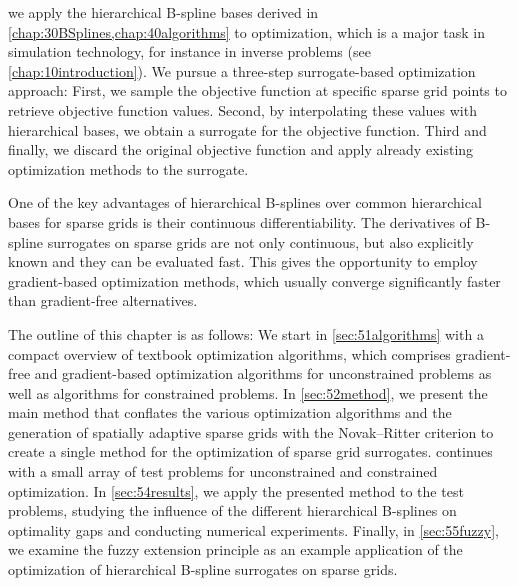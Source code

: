 
\label{chap:50optimization}

we apply the hierarchical B-spline bases derived in
\cref{chap:30BSplines,chap:40algorithms} to optimization,
which is a major task in simulation technology,
for instance in inverse problems (see \cref{chap:10introduction}).
We pursue a three-step surrogate-based optimization approach:
First, we sample the objective function at specific sparse grid points
to retrieve objective function values.
Second, by interpolating these values with hierarchical bases,
we obtain a surrogate for the objective function.
Third and finally, we discard the original objective function and apply
already existing optimization methods to the surrogate.

\vspace*{\fill}

One of the key advantages of hierarchical B-splines
over common hierarchical bases for
sparse grids is their continuous differentiability.
The derivatives of B-spline surrogates on sparse grids are not only continuous,
but also explicitly known and they can be evaluated fast.
This gives the opportunity to employ gradient-based optimization methods,
which usually converge significantly faster than gradient-free alternatives.

\vspace*{\fill}

The outline of this chapter is as follows:
We start in \cref{sec:51algorithms}
with a compact overview of textbook optimization algorithms,
\pagebreak%
which comprises gradient-free and gradient-based optimization algorithms
for unconstrained problems as well as algorithms for constrained problems.
In \cref{sec:52method}, we present the main method that
conflates the various optimization algorithms and
the generation of spatially adaptive sparse grids with the
Novak--Ritter criterion to create a single method for the
optimization of sparse grid surrogates.
 continues with a small array of test problems
for unconstrained and constrained optimization.
In \cref{sec:54results}, we apply the presented method
to the test problems, studying the influence of the different
hierarchical B-splines on optimality gaps and conducting
numerical experiments.
Finally, in \cref{sec:55fuzzy}, we examine the fuzzy extension principle
as an example application of the optimization of
hierarchical B-spline surrogates on sparse grids.

